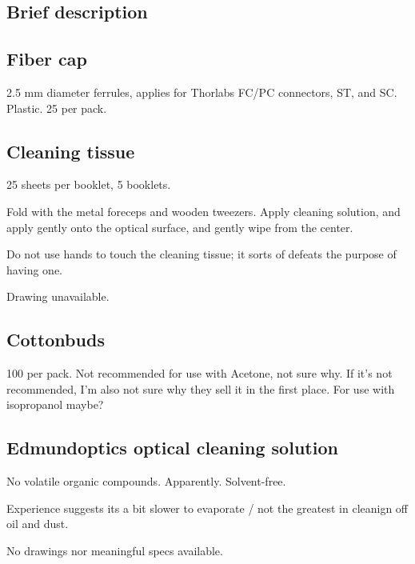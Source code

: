 \documentclass{article}
\begin{document}
\begin{multicols}{2}

\section{Brief description}
\subsection{Fiber cap}

2.5 mm diameter ferrules, applies for Thorlabs FC/PC connectors, ST, and SC. Plastic. 25 per pack.

\subsection{Cleaning tissue}
25 sheets per booklet, 5 booklets.

Fold with the metal foreceps and wooden tweezers. Apply cleaning solution, and apply gently onto the optical surface, and gently wipe from the center.

Do not use hands to touch the cleaning tissue; it sorts of defeats the purpose of having one.

Drawing unavailable.

\subsection{Cottonbuds}

100 per pack. Not recommended for use with Acetone, not sure why. If it's not recommended, I'm also not sure why they sell it in the first place. For use with isopropanol maybe?

\subsection{Edmundoptics optical cleaning solution}

No volatile organic compounds. Apparently. Solvent-free.

Experience suggests its a bit slower to evaporate / not the greatest in cleanign off oil and dust.

No drawings nor meaningful specs available.



\end{multicols}
\end{document}
